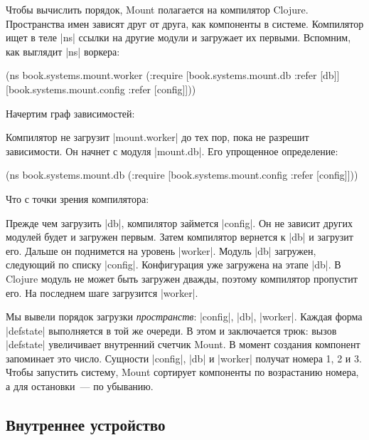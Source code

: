 Чтобы вычислить порядок, Mount полагается на компилятор
Clojure. Пространства имен зависят друг от друга, как компоненты в
системе. Компилятор ищет в теле \spverb|ns| ссылки на другие модули и загружает
их первыми. Вспомним, как выглядит \spverb|ns| воркера:

\begin{english}
  \begin{clojure}
(ns book.systems.mount.worker
  (:require
   [book.systems.mount.db :refer [db]]
   [book.systems.mount.config :refer [config]]))
  \end{clojure}
\end{english}

Начертим граф зависимостей:


Компилятор не загрузит \spverb|mount.worker| до тех пор, пока не разрешит
зависимости. Он начнет с модуля \spverb|mount.db|. Его упрощенное определение:

\begin{english}
  \begin{clojure}
(ns book.systems.mount.db
  (:require
   [book.systems.mount.config :refer [config]]))
  \end{clojure}
\end{english}

Что с точки зрения компилятора:


Прежде чем загрузить \spverb|db|, компилятор займется \spverb|config|. Он не
зависит других модулей будет и загружен первым. Затем компилятор вернется к
\spverb|db| и загрузит его. Дальше он поднимется на уровень
\spverb|worker|. Модуль \spverb|db| загружен, следующий по списку
\spverb|config|. Конфигурация уже загружена на этапе \spverb|db|. В Clojure
модуль не может быть загружен дважды, поэтому компилятор пропустит его. На
последнем шаге загрузится \spverb|worker|.

Мы вывели порядок загрузки \emph{пространств}: \spverb|config|, \spverb|db|,
\spverb|worker|. Каждая форма \spverb|defstate| выполняется в той же очереди. В
этом и заключается трюк: вызов \spverb|defstate| увеличивает внутренний счетчик
Mount. В момент создания компонент запоминает это число. Сущности
\spverb|config|, \spverb|db| и \spverb|worker| получат номера 1, 2 и 3. Чтобы
запустить систему, Mount сортирует компоненты по возрастанию номера, а для
остановки~--- по убыванию.

\subsection{Внутреннее устройство}

